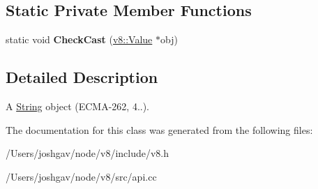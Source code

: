 \subsection*{Static Private Member Functions}
\begin{DoxyCompactItemize}
\item 
static void {\bfseries Check\+Cast} (\hyperlink{classv8_1_1_value}{v8\+::\+Value} $\ast$obj)\hypertarget{classv8_1_1_string_object_aa01c206a4300d68cda97c87f06f783a0}{}\label{classv8_1_1_string_object_aa01c206a4300d68cda97c87f06f783a0}

\end{DoxyCompactItemize}


\subsection{Detailed Description}
A \hyperlink{classv8_1_1_string}{String} object (E\+C\+M\+A-\/262, 4..). 

The documentation for this class was generated from the following files\+:\begin{DoxyCompactItemize}
\item 
/\+Users/joshgav/node/v8/include/v8.\+h\item 
/\+Users/joshgav/node/v8/src/api.\+cc\end{DoxyCompactItemize}
